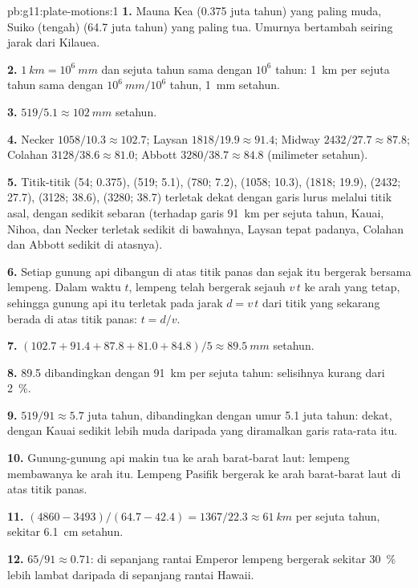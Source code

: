 \begin{solution}{pb:g11:plate-motions:1}
\textbf{1.} Mauna Kea (\num{0.375} juta tahun) yang paling muda, Suiko
(tengah) (\num{64.7} juta tahun) yang paling tua. Umurnya bertambah seiring
jarak dari Kilauea.

\textbf{2.} $\qty{1}{km} = 10^6~\unit{mm}$ dan sejuta tahun sama dengan $10^6$
tahun: \qty{1}{km} per sejuta tahun sama dengan $10^6~\unit{mm}/10^6$ tahun,
\qty{1}{mm} setahun.

\textbf{3.} $519/5.1 \approx \qty{102}{mm}$ setahun.

\textbf{4.} Necker $1058/10.3 \approx 102.7$; Laysan $1818/19.9 \approx
91.4$; Midway $2432/27.7 \approx 87.8$; Colahan $3128/38.6 \approx 81.0$;
Abbott $3280/38.7 \approx 84.8$ (milimeter setahun).

\textbf{5.} Titik-titik (54; 0.375), (519; 5.1), (780; 7.2), (1058; 10.3),
(1818; 19.9), (2432; 27.7), (3128; 38.6), (3280; 38.7) terletak dekat dengan
garis lurus melalui titik asal, dengan sedikit sebaran (terhadap garis
\qty{91}{km} per sejuta tahun, Kauai, Nihoa, dan Necker terletak sedikit di
bawahnya, Laysan tepat padanya, Colahan dan Abbott sedikit di atasnya).

\textbf{6.} Setiap gunung api dibangun di atas titik panas dan sejak itu
bergerak bersama lempeng. Dalam waktu $t$, lempeng telah bergerak sejauh $v\,t$
ke arah yang tetap, sehingga gunung api itu terletak pada jarak $d = v\,t$ dari
titik yang sekarang berada di atas titik panas: $t = d/v$.

\textbf{7.} $(102.7 + 91.4 + 87.8 + 81.0 + 84.8)/5 \approx \qty{89.5}{mm}$
setahun.

\textbf{8.} 89.5 dibandingkan dengan \qty{91}{km} per sejuta tahun: selisihnya
kurang dari \qty{2}{\percent}.

\textbf{9.} $519/91 \approx 5.7$ juta tahun, dibandingkan dengan umur \num{5.1}
juta tahun: dekat, dengan Kauai sedikit lebih muda daripada yang diramalkan garis
rata-rata itu.

\textbf{10.} Gunung-gunung api makin tua ke arah barat-barat laut: lempeng
membawanya ke arah itu. Lempeng Pasifik bergerak ke arah barat-barat laut di
atas titik panas.

\textbf{11.} $(4860 - 3493)/(64.7 - 42.4) = 1367/22.3 \approx \qty{61}{km}$
per sejuta tahun, sekitar \qty{6.1}{cm} setahun.

\textbf{12.} $65/91 \approx 0.71$: di sepanjang rantai Emperor lempeng bergerak
sekitar \qty{30}{\percent} lebih lambat daripada di sepanjang rantai Hawaii.


\end{solution}
